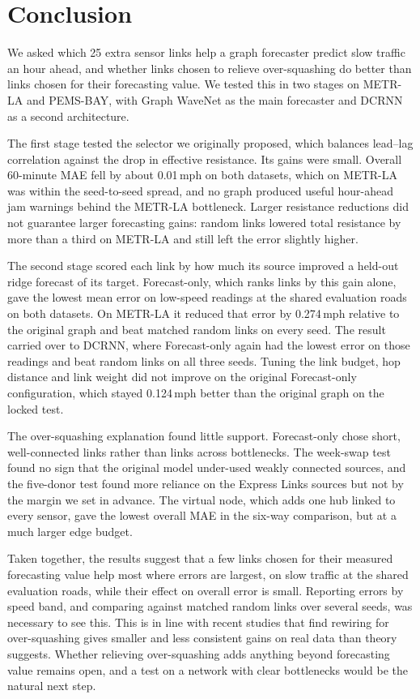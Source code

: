 \documentclass[journal]{IEEEtran}
\newcommand{\ms}{\,mph}
\begin{document}
\section{Conclusion}\label{sec:conclusion}
We asked which 25 extra sensor links help a graph forecaster predict slow traffic an hour ahead, and whether links chosen to relieve over-squashing do better than links chosen for their forecasting value. We tested this in two stages on METR-LA and PEMS-BAY, with Graph WaveNet as the main forecaster and DCRNN as a second architecture.

The first stage tested the selector we originally proposed, which balances lead--lag correlation against the drop in effective resistance. Its gains were small. Overall 60-minute MAE fell by about 0.01\ms{} on both datasets, which on METR-LA was within the seed-to-seed spread, and no graph produced useful hour-ahead jam warnings behind the METR-LA bottleneck. Larger resistance reductions did not guarantee larger forecasting gains: random links lowered total resistance by more than a third on METR-LA and still left the error slightly higher.

The second stage scored each link by how much its source improved a held-out ridge forecast of its target. Forecast-only, which ranks links by this gain alone, gave the lowest mean error on low-speed readings at the shared evaluation roads on both datasets. On METR-LA it reduced that error by 0.274\ms{} relative to the original graph and beat matched random links on every seed. The result carried over to DCRNN, where Forecast-only again had the lowest error on those readings and beat random links on all three seeds. Tuning the link budget, hop distance and link weight did not improve on the original Forecast-only configuration, which stayed 0.124\ms{} better than the original graph on the locked test.

The over-squashing explanation found little support. Forecast-only chose short, well-connected links rather than links across bottlenecks. The week-swap test found no sign that the original model under-used weakly connected sources, and the five-donor test found more reliance on the Express Links sources but not by the margin we set in advance. The virtual node, which adds one hub linked to every sensor, gave the lowest overall MAE in the six-way comparison, but at a much larger edge budget.

Taken together, the results suggest that a few links chosen for their measured forecasting value help most where errors are largest, on slow traffic at the shared evaluation roads, while their effect on overall error is small. Reporting errors by speed band, and comparing against matched random links over several seeds, was necessary to see this. This is in line with recent studies that find rewiring for over-squashing gives smaller and less consistent gains on real data than theory suggests. Whether relieving over-squashing adds anything beyond forecasting value remains open, and a test on a network with clear bottlenecks would be the natural next step.
\end{document}
